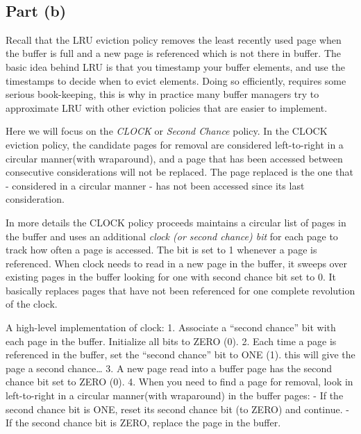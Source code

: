 \documentclass[11pt]{article}
\begin{document}
    \begin{center}
    \end{center}
    { \hspace*{\fill} \\}
    
    \hypertarget{part-b}{%
\subsection{Part (b)}\label{part-b}}

Recall that the LRU eviction policy removes the least recently used page
when the buffer is full and a new page is referenced which is not there
in buffer. The basic idea behind LRU is that you timestamp your buffer
elements, and use the timestamps to decide when to evict elements. Doing
so efficiently, requires some serious book-keeping, this is why in
practice many buffer managers try to approximate LRU with other eviction
policies that are easier to implement.

Here we will focus on the \emph{CLOCK} or \emph{Second Chance} policy.
In the CLOCK eviction policy, the candidate pages for removal are
considered left-to-right in a circular manner(with wraparound), and a
page that has been accessed between consecutive considerations will not
be replaced. The page replaced is the one that - considered in a
circular manner - has not been accessed since its last consideration.

In more details the CLOCK policy proceeds maintains a circular list of
pages in the buffer and uses an additional \emph{clock (or second
chance) bit} for each page to track how often a page is accessed. The
bit is set to 1 whenever a page is referenced. When clock needs to read
in a new page in the buffer, it sweeps over existing pages in the buffer
looking for one with second chance bit set to 0. It basically replaces
pages that have not been referenced for one complete revolution of the
clock.

A high-level implementation of clock: 1. Associate a ``second chance''
bit with each page in the buffer. Initialize all bits to ZERO (0). 2.
Each time a page is referenced in the buffer, set the ``second chance''
bit to ONE (1). this will give the page a second chance\ldots{} 3. A new
page read into a buffer page has the second chance bit set to ZERO (0).
4. When you need to find a page for removal, look in left-to-right in a
circular manner(with wraparound) in the buffer pages: - If the second
chance bit is ONE, reset its second chance bit (to ZERO) and continue. -
If the second chance bit is ZERO, replace the page in the buffer.
\end{document}
